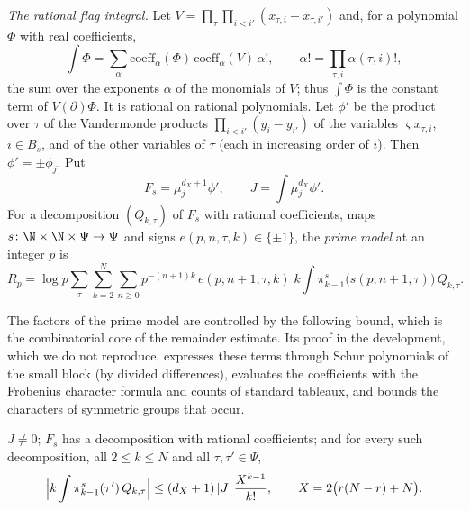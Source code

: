 \emph{The rational flag integral.} Let $V=\prod_\tau\prod_{i<i'}(x_{\tau,i}-x_{\tau,i'})$ and, for a polynomial $\Phi$ with
real coefficients,
\[
\textstyle\int\Phi=\sum_\alpha\mathrm{coeff}_\alpha(\Phi)\,\mathrm{coeff}_\alpha(V)\,\alpha!,\qquad
\alpha!=\prod_{\tau,i}\alpha(\tau,i)!,
\]
the sum over the exponents $\alpha$ of the monomials of $V$; thus $\int\Phi$ is the constant term of $V(\partial)\Phi$.
It is rational on rational polynomials. Let $\phi'$ be the product over
$\tau$ of the Vandermonde products $\prod_{i<i'}(y_i-y_{i'})$ of the variables $\varsigma x_{\tau,i}$, $i\in B_s$, and
of the other variables of $\tau$ (each in increasing order of $i$). Then $\phi'=\pm\phi_j$. Put
\[
F_s=\mu_j^{d_X+1}\phi',\qquad J=\textstyle\int\mu_j^{d_X}\phi'.
\]
For a decomposition $(Q_{k,\tau})$ of $F_s$ with rational coefficients, maps $s\colon\N\times\N\times
\Psi\to\Psi$ and signs $e(p,n,\tau,k)\in\{\pm1\}$, the \emph{prime model} at an integer $p$ is
\begin{equation}\label{pf:volthm:eq:primemodel}
R_p=\log p\sum_\tau\sum_{k=2}^N\sum_{n\ge0}p^{-(n+1)k}\,e(p,n+1,\tau,k)\;k\!\int\pi^s_{k-1}\bigl(s(p,n+1,\tau)\bigr)\,
Q_{k,\tau}.
\end{equation}

The factors of the prime model are controlled by the following bound, which is the combinatorial core of the
remainder estimate. Its proof in the development, which we do not reproduce, expresses these terms through Schur
polynomials of the small block (by divided differences), evaluates the coefficients with the Frobenius character
formula and counts of standard tableaux, and bounds the characters of symmetric groups that occur.

\begin{proposition}\label{pf:volthm:prop:factor}
$J\ne0$; $F_s$ has a decomposition with rational coefficients; and for every such decomposition, all
$2\le k\le N$ and all $\tau,\tau'\in\Psi$,
\[
\Bigl|k\int\pi^s_{k-1}(\tau')\,Q_{k,\tau}\Bigr|\le(d_X+1)\,|J|\,\frac{X^{k-1}}{k!},\qquad X=2\bigl(r(N-r)+N\bigr).
\]
\end{proposition}

